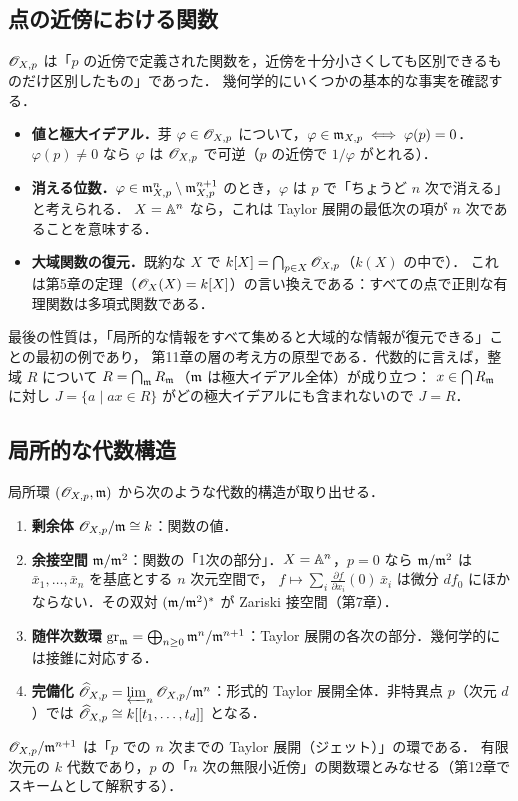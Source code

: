 \subsection{点の近傍における関数}

$\mathscr{O}_{X,p}$ は「$p$ の近傍で定義された関数を，近傍を十分小さくしても区別できるものだけ区別したもの」であった．
幾何学的にいくつかの基本的な事実を確認する．

\begin{itemize}
  \item \textbf{値と極大イデアル．}芽 $\varphi\in\mathscr{O}_{X,p}$ について，$\varphi\in\mathfrak{m}_{X,p}\iff\varphi(p)=0$．
        $\varphi(p)\ne0$ なら $\varphi$ は $\mathscr{O}_{X,p}$ で可逆（$p$ の近傍で $1/\varphi$ がとれる）．
  \item \textbf{消える位数．}$\varphi\in\mathfrak{m}_{X,p}^n\setminus\mathfrak{m}_{X,p}^{n+1}$ のとき，$\varphi$ は $p$ で「ちょうど $n$ 次で消える」と考えられる．
        $X=\mathbb{A}^n$ なら，これは Taylor 展開の最低次の項が $n$ 次であることを意味する．
  \item \textbf{大域関数の復元．}既約な $X$ で $k[X]=\bigcap_{p\in X}\mathscr{O}_{X,p}$（$k(X)$ の中で）．
        これは第5章の定理（$\mathscr{O}_X(X)=k[X]$）の言い換えである：すべての点で正則な有理関数は多項式関数である．
\end{itemize}

最後の性質は，「局所的な情報をすべて集めると大域的な情報が復元できる」ことの最初の例であり，
第11章の層の考え方の原型である．代数的に言えば，整域 $R$ について $R=\bigcap_{\mathfrak{m}}R_{\mathfrak{m}}$（$\mathfrak{m}$ は極大イデアル全体）が成り立つ：
$x\in\bigcap R_{\mathfrak{m}}$ に対し $J=\{a\mid ax\in R\}$ がどの極大イデアルにも含まれないので $J=R$．

\subsection{局所的な代数構造}

局所環 $(\mathscr{O}_{X,p},\mathfrak{m})$ から次のような代数的構造が取り出せる．
\begin{enumerate}
  \item \textbf{剰余体} $\mathscr{O}_{X,p}/\mathfrak{m}\cong k$：関数の値．
  \item \textbf{余接空間} $\mathfrak{m}/\mathfrak{m}^2$：関数の「1次の部分」．$X=\mathbb{A}^n$，$p=0$ なら $\mathfrak{m}/\mathfrak{m}^2$ は $\bar x_1,\dots,\bar x_n$ を基底とする $n$ 次元空間で，
        $f\mapsto\sum_i\frac{\partial f}{\partial x_i}(0)\,\bar x_i$ は微分 $df_0$ にほかならない．その双対 $(\mathfrak{m}/\mathfrak{m}^2)^*$ が Zariski 接空間（第7章）．
  \item \textbf{随伴次数環} $\mathrm{gr}_{\mathfrak{m}}=\bigoplus_{n\ge0}\mathfrak{m}^n/\mathfrak{m}^{n+1}$：Taylor 展開の各次の部分．幾何学的には接錐に対応する．
  \item \textbf{完備化} $\widehat{\mathscr{O}}_{X,p}=\varprojlim_n\mathscr{O}_{X,p}/\mathfrak{m}^n$：形式的 Taylor 展開全体．非特異点 $p$（次元 $d$）では $\widehat{\mathscr{O}}_{X,p}\cong k[[t_1,\dots,t_d]]$ となる．
\end{enumerate}
$\mathscr{O}_{X,p}/\mathfrak{m}^{n+1}$ は「$p$ での $n$ 次までの Taylor 展開（ジェット）」の環である．
有限次元の $k$ 代数であり，$p$ の「$n$ 次の無限小近傍」の関数環とみなせる（第12章でスキームとして解釈する）．

